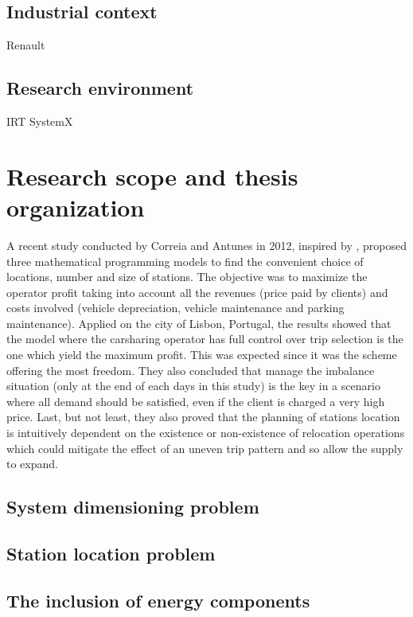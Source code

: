 \begin{bibunit}[ieeetr]
\subsection{Industrial context}
Renault

\subsection{Research environment}
IRT SystemX

\section{Research scope and thesis organization}
A recent study conducted by Correia and Antunes \cite{correia_optimization_2012} in 2012, inspired by \cite{fan_carsharing_2008}, proposed three
mathematical programming models to find the convenient choice of locations, number and size
of stations.
The objective was to maximize the operator profit taking into account all the revenues (price paid by clients) and costs involved (vehicle depreciation, vehicle maintenance
and parking maintenance).
Applied on the city of Lisbon, Portugal, the results showed that the model where the carsharing operator has full control over trip selection is the one which yield the maximum profit.
This was expected since it was the scheme offering the most freedom.
They also concluded that manage the imbalance situation (only at the end of each days in this study) is the key in a scenario where all demand should be satisfied, even if the client is charged a very high price.
Last, but not least, they also proved that the planning of stations location is intuitively dependent on the existence or non-existence of relocation operations which could
mitigate the effect of an uneven trip pattern and so allow the supply to expand.

\subsection{System dimensioning problem}

\subsection{Station location problem}

\subsection{The inclusion of energy components}


\newpage
{}
\renewcommand{\bibname}{Bibliography of chapter \thechapter}
\end{bibunit}
